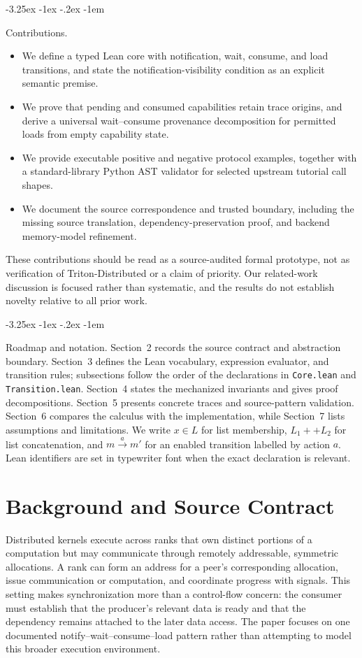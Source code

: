 \documentclass[a4paper,USenglish]{lipics-v2021}
\makeatletter
\renewcommand\paragraph{\@startsection{paragraph}{4}{\z@}%
  {-3.25ex \@plus -1ex \@minus -.2ex}%
  {-1em}%
  {\sffamily\large\bfseries\raggedright}}
\makeatother
\begin{document}
\paragraph{Contributions.}
\begin{itemize}
  \item We define a typed Lean core with notification, wait, consume, and load transitions, and state the notification-visibility condition as an explicit semantic premise.
  \item We prove that pending and consumed capabilities retain trace origins, and derive a universal wait--consume provenance decomposition for permitted loads from empty capability state.
  \item We provide executable positive and negative protocol examples, together with a standard-library Python AST validator for selected upstream tutorial call shapes.
  \item We document the source correspondence and trusted boundary, including the missing source translation, dependency-preservation proof, and backend memory-model refinement.
\end{itemize}

These contributions should be read as a source-audited formal prototype, not as verification of Triton-Distributed or a claim of priority. Our related-work discussion is focused rather than systematic, and the results do not establish novelty relative to all prior work.

\paragraph{Roadmap and notation.}
Section~2 records the source contract and abstraction boundary. Section~3
defines the Lean vocabulary, expression evaluator, and transition rules;
subsections follow the order of the declarations in \texttt{Core.lean} and
\texttt{Transition.lean}. Section~4 states the mechanized invariants and gives
proof decompositions. Section~5 presents concrete traces and source-pattern
validation. Section~6 compares the calculus with the implementation, while
Section~7 lists assumptions and limitations. We write \(x\in L\) for list
membership, \(L_1++L_2\) for list concatenation, and \(m\xrightarrow{a}m'\)
for an enabled transition labelled by action \(a\). Lean identifiers are set
in typewriter font when the exact declaration is relevant.

\section{Background and Source Contract}
Distributed kernels execute across ranks that own distinct portions of a computation but may communicate through remotely addressable, symmetric allocations. A rank can form an address for a peer's corresponding allocation, issue communication or computation, and coordinate progress with signals. This setting makes synchronization more than a control-flow concern: the consumer must establish that the producer's relevant data is ready and that the dependency remains attached to the later data access. The paper focuses on one documented notify--wait--consume--load pattern rather than attempting to model this broader execution environment.
\end{document}
